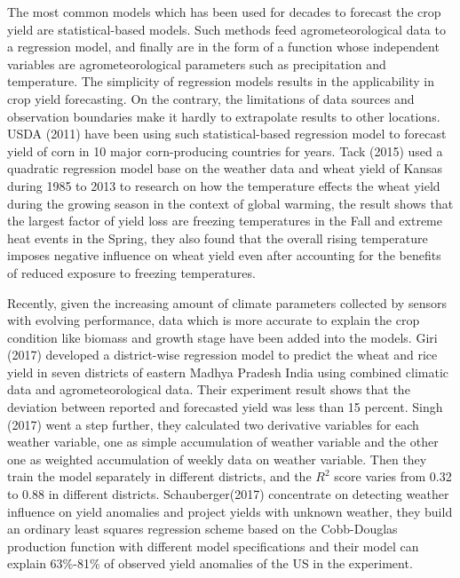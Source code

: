 \documentclass[conference, a4paper]{IEEEtran}
\begin{document}
  The most common models which has been used for decades to forecast the crop yield are statistical-based models. Such methods feed agrometeorological data to a regression model, and finally are in the form of a function whose independent variables are agrometeorological parameters such as precipitation and temperature. The simplicity of regression models results in the applicability in crop yield forecasting. On the contrary, the limitations of data sources and observation boundaries make it hardly to extrapolate results to other locations. USDA (2011) \cite{goodUSDACornSoybean2011} have been using such statistical-based regression model to forecast yield of corn in 10 major corn-producing countries for years. Tack (2015)\cite{tackEffectWarmingTemperatures2015} used a quadratic regression model base on the weather data and wheat yield of Kansas during 1985 to 2013 to research on how the temperature effects the wheat yield during the growing season in the context of global warming, the result shows that the largest factor of yield loss are freezing temperatures in the Fall and extreme heat events in the Spring, they also found that the overall rising temperature imposes negative influence on wheat yield even after accounting for the benefits of reduced exposure to freezing temperatures. 

  Recently, given the increasing amount of climate parameters collected by sensors with evolving performance, data which is more accurate to explain the crop condition like biomass and growth stage have been added into the models. Giri (2017) \cite{giriDistrictwiseWheatRice2017} developed a district-wise regression model to predict the wheat and rice yield in seven districts of eastern Madhya Pradesh India using combined climatic data and agrometeorological data. Their experiment result shows that the deviation between reported and forecasted yield was less than 15 percent. Singh (2017) \cite{singhForecastingMaizeYield2017} went a step further, they calculated two derivative variables for each weather variable, one as simple accumulation of weather variable and the other one as weighted accumulation of weekly data on weather variable. Then they train the model separately in different districts, and the $R^2$ score varies from 0.32 to 0.88 in different districts. Schauberger(2017)\cite{schaubergerGlobalEvaluationSemiempirical2017} concentrate on detecting weather influence on yield anomalies and project yields with unknown weather, they build an ordinary least squares regression scheme based on the Cobb-Douglas production function with different model specifications and their model can explain 63\%-81\% of observed yield anomalies of the US in the experiment.
\end{document}
